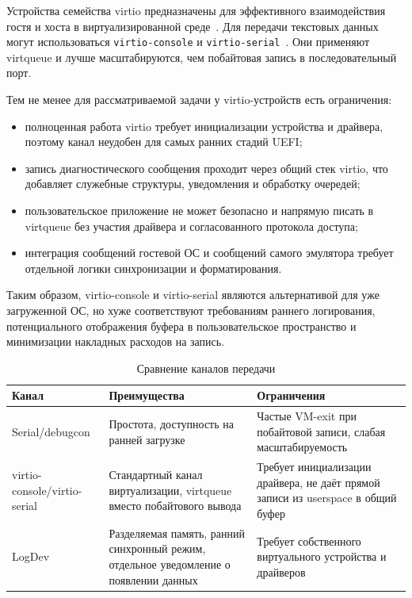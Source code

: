 Устройства семейства virtio предназначены для эффективного взаимодействия гостя
и хоста в виртуализированной среде~\cite{virtio_spec}. Для передачи текстовых
данных могут использоваться \texttt{virtio-console} и
\texttt{virtio-serial}~\cite{virtio_console}. Они применяют virtqueue и лучше
масштабируются, чем побайтовая запись в последовательный порт.

Тем не менее для рассматриваемой задачи у virtio-устройств есть ограничения:
\begin{itemize}
    \item полноценная работа virtio требует инициализации устройства и драйвера,
    поэтому канал неудобен для самых ранних стадий UEFI;
    \item запись диагностического сообщения проходит через общий стек virtio, что
    добавляет служебные структуры, уведомления и обработку очередей;
    \item пользовательское приложение не может безопасно и напрямую писать в
    virtqueue без участия драйвера и согласованного протокола доступа;
    \item интеграция сообщений гостевой ОС и сообщений самого эмулятора требует
    отдельной логики синхронизации и форматирования.
\end{itemize}

Таким образом, virtio-console и virtio-serial являются альтернативой для уже
загруженной ОС, но хуже соответствуют требованиям раннего логирования,
потенциального отображения буфера в пользовательское пространство и минимизации
накладных расходов на запись.

\begin{table}[H]
    \centering
    \caption{Сравнение каналов передачи}
    \label{tab:channels-comparison}
    \small
    \begin{tabularx}{\textwidth}{|p{3.2cm}|X|X|}
        \hline
        Канал & Преимущества & Ограничения \\
        \hline
        Serial/debugcon &
        Простота, доступность на ранней загрузке &
        Частые VM-exit при побайтовой записи, слабая масштабируемость \\
        \hline
        virtio-console/virtio-serial &
        Стандартный канал виртуализации, virtqueue вместо побайтового вывода &
        Требует инициализации драйвера, не даёт прямой записи из userspace в общий буфер \\
        \hline
        LogDev &
        Разделяемая память, ранний синхронный режим, отдельное уведомление о появлении данных &
        Требует собственного виртуального устройства и драйверов \\
        \hline
    \end{tabularx}
\end{table}

